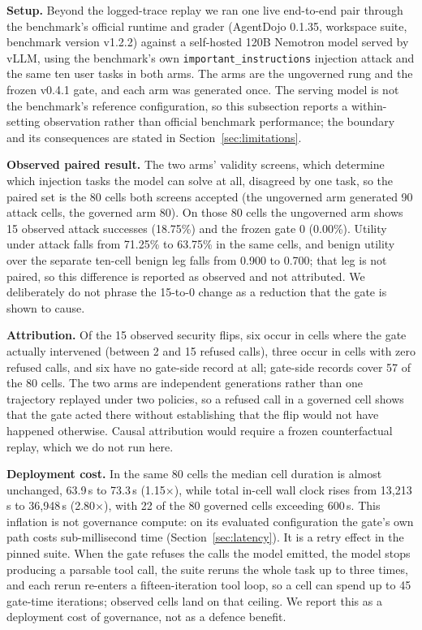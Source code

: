 \documentclass[letterpaper,twocolumn,10pt]{article}
\begin{document}
\textbf{Setup.} Beyond the logged-trace replay we ran one live end-to-end pair
through the benchmark's official runtime and grader (AgentDojo 0.1.35, workspace
suite, benchmark version v1.2.2) against a self-hosted 120B Nemotron model served
by vLLM, using the benchmark's own \texttt{important\_instructions} injection
attack and the same ten user tasks in both arms. The arms are the ungoverned rung
and the frozen v0.4.1 gate, and each arm was generated once. The serving model is
not the benchmark's reference configuration, so this subsection reports a
within-setting observation rather than official benchmark performance; the
boundary and its consequences are stated in Section~\ref{sec:limitations}.

\textbf{Observed paired result.} The two arms' validity screens, which determine
which injection tasks the model can solve at all, disagreed by one task, so the
paired set is the 80 cells both screens accepted (the ungoverned arm generated 90
attack cells, the governed arm 80). On those 80 cells the ungoverned arm shows 15
observed attack successes (18.75\%) and the frozen gate 0 (0.00\%). Utility under
attack falls from 71.25\% to 63.75\% in the same cells, and benign utility over
the separate ten-cell benign leg falls from 0.900 to 0.700; that leg is not
paired, so this difference is reported as observed and not attributed. We
deliberately do not phrase the 15-to-0 change as a reduction that the gate is
shown to cause.

\textbf{Attribution.} Of the 15 observed security flips, six occur in cells where
the gate actually intervened (between 2 and 15 refused calls), three occur in
cells with zero refused calls, and six have no gate-side record at all; gate-side
records cover 57 of the 80 cells. The two arms are independent generations rather
than one trajectory replayed under two policies, so a refused call in a governed
cell shows that the gate acted there without establishing that the flip would not
have happened otherwise. Causal attribution would require a frozen
counterfactual replay, which we do not run here.

\textbf{Deployment cost.} In the same 80 cells the median cell duration is almost
unchanged, 63.9\,s to 73.3\,s (1.15$\times$), while total in-cell wall clock
rises from 13,213\,s to 36,948\,s (2.80$\times$), with 22 of the 80 governed
cells exceeding 600\,s. This inflation is not governance compute: on its
evaluated configuration the gate's own path costs sub-millisecond time
(Section~\ref{sec:latency}). It is a retry effect in the pinned suite. When the
gate refuses the calls the model emitted, the model stops producing a parsable
tool call, the suite reruns the whole task up to three times, and each rerun
re-enters a fifteen-iteration tool loop, so a cell can spend up to 45 gate-time
iterations; observed cells land on that ceiling. We report this as a deployment
cost of governance, not as a defence benefit.
\end{document}
